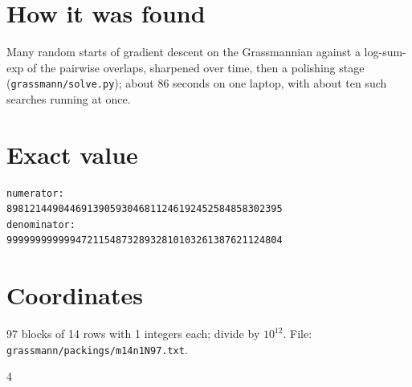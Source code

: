 \documentclass[11pt,a4paper]{article}
\begin{document}
\section{How it was found}
Many random starts of gradient descent on the Grassmannian against a log-sum-exp of the pairwise overlaps, sharpened over time, then a polishing stage (\texttt{grassmann/solve.py}); about 86 seconds on one laptop, with about ten such searches running at once.


\appendix
\section{Exact value}
{\small
\begin{verbatim}
numerator:
898121449044691390593046811246192452584858302395
denominator:
999999999999472115487328932810103261387621124804
\end{verbatim}}

\section{Coordinates}
97 blocks of 14 rows with 1 integers each; divide by $10^{12}$. File: \texttt{grassmann/packings/m14n1N97.txt}.
{\tiny
\begin{multicols}{4}
\end{multicols}}
\end{document}
